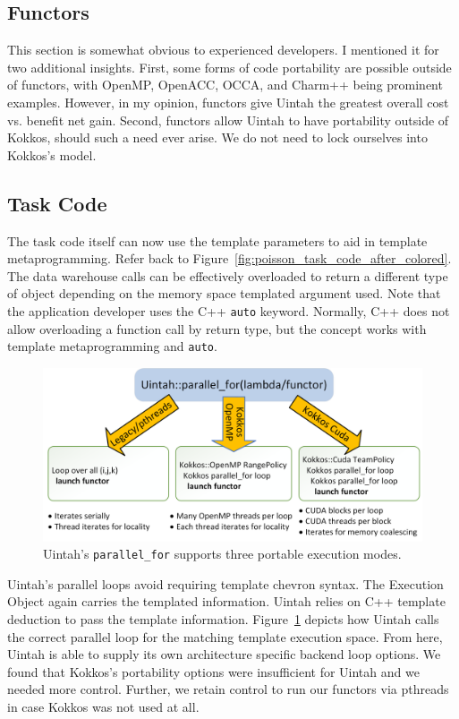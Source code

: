 \documentclass[]{article}
\begin{document}
\subsection{Functors}

This section is somewhat obvious to experienced developers.  I mentioned it for two additional insights.  First, some forms of code portability are possible outside of functors, with OpenMP, OpenACC, OCCA, and Charm++ being prominent examples.  However, in my opinion, functors give Uintah the greatest overall cost vs. benefit net gain.  Second, functors allow Uintah to have portability outside of Kokkos, should such a need ever arise.  We do not need to lock ourselves into Kokkos's model.    

\subsection{Task Code}

The task code itself can now use the template parameters to aid in template metaprogramming.  Refer back to Figure~\ref{fig:poisson_task_code_after_colored}.  The data warehouse calls can be effectively overloaded to return a different type of object depending on the memory space templated argument used.  Note that the application developer uses the C++ \texttt{auto} keyword.  Normally, C++ does not allow overloading a function call by return type, but the concept works with template metaprogramming and \texttt{auto}.  

\begin{figure}[h]
	\centerline{
		\includegraphics[width=1.0\textwidth,draft=false]{figures/uintah_parallel_for.png}
	}
	\caption{Uintah's \texttt{parallel\_for} supports three portable execution modes.} 
	\label{fig:uintah_parallel_for}
\end{figure}

Uintah's parallel loops avoid requiring template chevron syntax.  The Execution Object again carries the templated information.  Uintah relies on C++ template deduction to pass the template information.  Figure~\ref{fig:uintah_parallel_for} depicts how Uintah calls the correct parallel loop for the matching template execution space.  From here, Uintah is able to supply its own architecture specific backend loop options.  We found that Kokkos's portability options were insufficient for Uintah and we needed more control.  Further, we retain control to run our functors via pthreads in case Kokkos was not used at all.  
\end{document}
